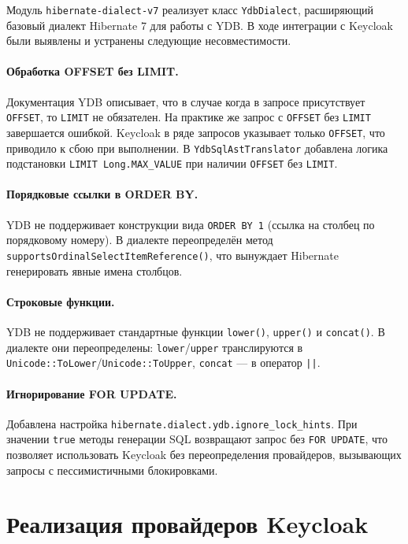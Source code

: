\documentclass[times]{itmo-student-thesis}
\begin{document}
Модуль \texttt{hibernate-dialect-v7} реализует класс \texttt{YdbDialect},
расширяющий базовый диалект Hibernate 7 для работы с YDB.
В ходе интеграции с Keycloak были выявлены и устранены следующие несовместимости.

\paragraph{Обработка OFFSET без LIMIT.}
Документация YDB описывает, что в случае когда в запросе присутствует
\texttt{OFFSET}, то \texttt{LIMIT} не обязателен.
На практике же запрос с \texttt{OFFSET} без \texttt{LIMIT} завершается ошибкой.
Keycloak в ряде запросов указывает только \texttt{OFFSET}, что приводило к сбою при выполнении.
В \texttt{YdbSqlAstTranslator} добавлена логика подстановки \texttt{LIMIT Long.MAX\_VALUE}
при наличии \texttt{OFFSET} без \texttt{LIMIT}.

\paragraph{Порядковые ссылки в ORDER BY.}
YDB не поддерживает конструкции вида \texttt{ORDER BY 1} (ссылка на столбец по порядковому
номеру). В диалекте переопределён метод \texttt{supportsOrdinalSelectItemReference()},
что вынуждает Hibernate генерировать явные имена столбцов.

\paragraph{Строковые функции.}
YDB не поддерживает стандартные функции \texttt{lower()}, \texttt{upper()} и
\texttt{concat()}. В диалекте они переопределены: \texttt{lower}/\texttt{upper}
транслируются в \texttt{Unicode::ToLower}/\texttt{Unicode::ToUpper},
\texttt{concat} --- в оператор \texttt{||}.

\paragraph{Игнорирование FOR UPDATE.}
Добавлена настройка \texttt{hibernate.dialect.ydb.ignore\_lock\_hints}.
При значении \texttt{true} методы генерации SQL возвращают запрос без
\texttt{FOR UPDATE}, что позволяет использовать Keycloak без переопределения
провайдеров, вызывающих запросы с пессимистичными блокировками.


\section{Реализация провайдеров Keycloak}
\end{document}
